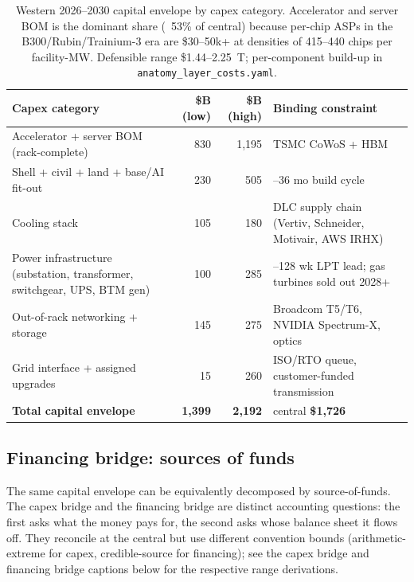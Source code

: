 \documentclass[11pt,a4paper]{article}
\begin{document}
\begin{table}[htbp]
\centering
\small
\begin{tabularx}{\textwidth}{@{}>{\raggedright\arraybackslash}Xrr>{\raggedright\arraybackslash}X@{}}
\toprule
\textbf{Capex category} & \textbf{\$B (low)} & \textbf{\$B (high)} & \textbf{Binding constraint} \\
\midrule
Accelerator + server BOM (rack-complete) & 830 & 1{,}195 & TSMC CoWoS + HBM \\
Shell + civil + land + base/AI fit-out & 230 & 505 & 24--36 mo build cycle \\
Cooling stack & 105 & 180 & DLC supply chain (Vertiv, Schneider, Motivair, AWS IRHX) \\
Power infrastructure (substation, transformer, switchgear, UPS, BTM gen) & 100 & 285 & 80--128 wk LPT lead; gas turbines sold out 2028+ \\
Out-of-rack networking + storage & 145 & 275 & Broadcom T5/T6, NVIDIA Spectrum-X, optics \\
Grid interface + assigned upgrades & 15 & 260 & ISO/RTO queue, customer-funded transmission \\
\midrule
\textbf{Total capital envelope} & \textbf{1{,}399} & \textbf{2{,}192} & central \textbf{\$1{,}726} \\
\bottomrule
\end{tabularx}
\caption{Western 2026--2030 capital envelope by capex category. Accelerator and server BOM is the dominant share (~53\% of central) because per-chip ASPs in the B300/Rubin/Trainium-3 era are \$30--50k+ at densities of 415--440 chips per facility-MW. Defensible range \$1.44--2.25~T; per-component build-up in \texttt{anatomy\_layer\_costs.yaml}.}
\end{table}

\subsection{Financing bridge: sources of funds}
\label{subsec:financing-bridge}

The same capital envelope can be equivalently decomposed by source-of-funds. The capex bridge and the financing bridge are distinct accounting questions: the first asks what the money pays for, the second asks whose balance sheet it flows off. They reconcile at the central but use different convention bounds (arithmetic-extreme for capex, credible-source for financing); see the capex bridge and financing bridge captions below for the respective range derivations.
\end{document}
